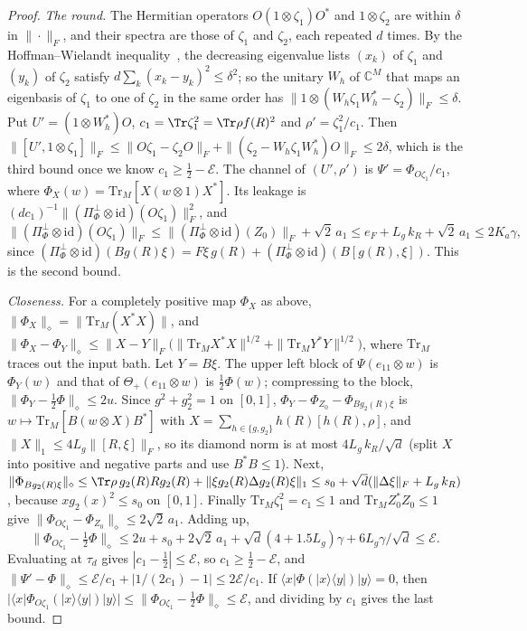 \begin{proof}
\emph{The round.} The Hermitian operators $O(1\otimes\zeta_1)O^*$ and $1\otimes\zeta_2$ are within $\delta$ in $\|\cdot\|_F$, and their spectra are those of $\zeta_1$
and $\zeta_2$, each repeated $d$ times. By the Hoffman--Wielandt inequality~\cite{HoffmanWielandt1953}, the decreasing eigenvalue lists
$(x_k)$ of $\zeta_1$ and $(y_k)$ of $\zeta_2$ satisfy $d\sum_k(x_k-y_k)^2\le\delta^2$; so the unitary $W_h$ of $\mathbb C^M$ that maps an eigenbasis of
$\zeta_1$ to one of $\zeta_2$ in the same order has $\|1\otimes(W_h\zeta_1W_h^*-\zeta_2)\|_F\le\delta$. Put $U'=(1\otimes W_h^*)O$, $c_1=\Tr\zeta_1^2=\Tr\rho f(R)^2$
and $\rho'=\zeta_1^2/c_1$. Then $\|[U',1\otimes\zeta_1]\|_F\le\|O\zeta_1-\zeta_2O\|_F+\|(\zeta_2-W_h\zeta_1W_h^*)O\|_F\le2\delta$, which is the third bound once we
know $c_1\ge\frac12-\mathcal E$. The channel of $(U',\rho')$ is $\Psi'=\Phi_{O\zeta_1}/c_1$, where $\Phi_X(w)=\mathrm{Tr}_M[X(w\otimes1)X^*]$. Its leakage is
$(dc_1)^{-1}\|(\Pi_\Phi^\perp\otimes\mathrm{id})(O\zeta_1)\|_F^2$, and
\[
\|(\Pi_\Phi^\perp\otimes\mathrm{id})(O\zeta_1)\|_F\le\|(\Pi_\Phi^\perp\otimes\mathrm{id})(Z_0)\|_F+\sqrt2\,a_1\le e_F+L_g\,k_R+\sqrt2\,a_1\le2K_a\gamma,
\]
since $(\Pi_\Phi^\perp\otimes\mathrm{id})(Bg(R)\xi)=F\xi\,g(R)+(\Pi_\Phi^\perp\otimes\mathrm{id})(B[g(R),\xi])$. This is the second bound.

\emph{Closeness.} For a completely positive map $\Phi_X$ as above, $\|\Phi_X\|_\diamond=\|\mathrm{Tr}_M(X^*X)\|$, and
$\|\Phi_X-\Phi_Y\|_\diamond\le\|X-Y\|_F\bigl(\|\mathrm{Tr}_M X^*X\|^{1/2}+\|\mathrm{Tr}_M Y^*Y\|^{1/2}\bigr)$, where $\mathrm{Tr}_M$ traces out the input bath.
Let $Y=B\xi$. The upper left block of $\Psi(e_{11}\otimes w)$ is $\Phi_Y(w)$ and that of $\Theta_+(e_{11}\otimes w)$ is $\frac12\Phi(w)$; compressing to
the block, $\|\Phi_Y-\frac12\Phi\|_\diamond\le2u$. Since $g^2+g_2^2=1$ on $[0,1]$, $\Phi_Y-\Phi_{Z_0}-\Phi_{Bg_2(R)\xi}$ is
$w\mapsto\mathrm{Tr}_M[B(w\otimes X)B^*]$ with $X=\sum_{h\in\{g,g_2\}}h(R)[h(R),\rho]$, and $\|X\|_1\le4L_g\|[R,\xi]\|_F$, so its diamond norm is at most
$4L_g\,k_R/\sqrt d$ (split $X$ into positive and negative parts and use $B^*B\le1$). Next,
$\|\Phi_{Bg_2(R)\xi}\|_\diamond\le\Tr\rho\,g_2(R)Rg_2(R)+\|\xi g_2(R)\Delta g_2(R)\xi\|_1\le s_0+\sqrt d(\|\Delta\xi\|_F+L_g\,k_R)$, because $xg_2(x)^2\le s_0$ on
$[0,1]$. Finally $\mathrm{Tr}_M\zeta_1^2=c_1\le1$ and $\mathrm{Tr}_M Z_0^*Z_0\le1$ give $\|\Phi_{O\zeta_1}-\Phi_{Z_0}\|_\diamond\le2\sqrt2\,a_1$. Adding up,
\[
\bigl\|\Phi_{O\zeta_1}-\tfrac12\Phi\bigr\|_\diamond\le2u+s_0+2\sqrt2\,a_1+\sqrt d(4+1.5L_g)\gamma+6L_g\gamma/\sqrt d\le \mathcal E .
\]
Evaluating at $\tau_d$ gives $|c_1-\frac12|\le \mathcal E$, so $c_1\ge\frac12-\mathcal E$, and $\|\Psi'-\Phi\|_\diamond\le \mathcal E/c_1+|1/(2c_1)-1|\le2\mathcal E/c_1$. If
$\langle x|\Phi(|x\rangle\langle y|)|y\rangle=0$, then $|\langle x|\Phi_{O\zeta_1}(|x\rangle\langle y|)|y\rangle|\le\|\Phi_{O\zeta_1}-\frac12\Phi\|_\diamond\le \mathcal E$, and dividing by
$c_1$ gives the last bound.
\end{proof}


